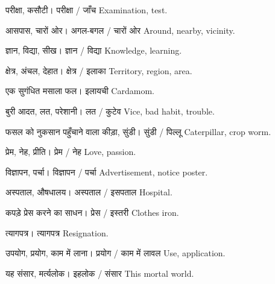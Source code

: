 %
{परीक्षा, कसौटी।}%
{परीक्षा / जाँच}%
{Examination, test.}

%
{आसपास, चारों ओर।}%
{अगल-बगल / चारों ओर}%
{Around, nearby, vicinity.}

%
{ज्ञान, विद्या, सीख।}%
{ज्ञान / विद्या}%
{Knowledge, learning.}

%
{क्षेत्र, अंचल, देहात।}%
{क्षेत्र / इलाका}%
{Territory, region, area.}

%
{एक सुगंधित मसाला फल।}%
{इलायची}%
{Cardamom.}

%
{बुरी आदत, लत, परेशानी।}%
{लत / कुटेव}%
{Vice, bad habit, trouble.}

%
{फसल को नुकसान पहुँचाने वाला कीड़ा, सुंडी।}%
{सुंडी / पिल्लू}%
{Caterpillar, crop worm.}

%
{प्रेम, नेह, प्रीति।}%
{प्रेम / नेह}%
{Love, passion.}

%
{विज्ञापन, पर्चा।}%
{विज्ञापन / पर्चा}%
{Advertisement, notice poster.}

%
{अस्पताल, औषधालय।}%
{अस्पताल / इसपताल}%
{Hospital.}

%
{कपड़े प्रेस करने का साधन।}%
{प्रेस / इस्तरी}%
{Clothes iron.}

%
{त्यागपत्र।}%
{त्यागपत्र}%
{Resignation.}

%
{उपयोग, प्रयोग, काम में लाना।}%
{प्रयोग / काम में लावल}%
{Use, application.}

%
{यह संसार, मर्त्यलोक।}%
{इहलोक / संसार}%
{This mortal world.}

